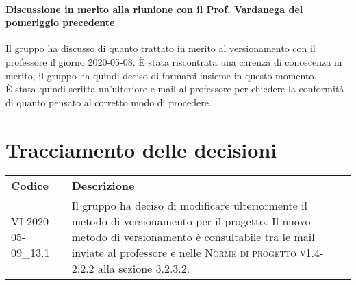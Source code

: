 \documentclass{article}
\begin{document}
\paragraph*{Discussione in merito alla riunione con il Prof. Vardanega del pomeriggio precedente}
Il gruppo ha discusso di quanto trattato in merito al versionamento con il professore il giorno 2020-05-08. È stata riscontrata una carenza di conoscenza in merito; il gruppo ha quindi deciso di formarsi insieme in questo momento. \\
È stata quindi scritta un'ulteriore e-mail al professore per chiedere la conformità di quanto pensato al corretto modo di procedere.

\section{Tracciamento delle decisioni}
\begin{table}[H]
  \centering
  \begin{tabular}{p{4cm}|p{12cm}}
    \rowcolor{lightgray}
    \textbf{Codice}  & \textbf{Descrizione}      \\
     VI-2020-05-09\_13.1 & Il gruppo ha deciso di modificare ulteriormente il metodo di versionamento per il progetto. Il nuovo metodo di versionamento è consultabile tra le mail inviate al professore e nelle \textsc{Norme di progetto v1.4-2.2.2} alla sezione 3.2.3.2. \\
  \end{tabular}
\end{table}
\end{document}
